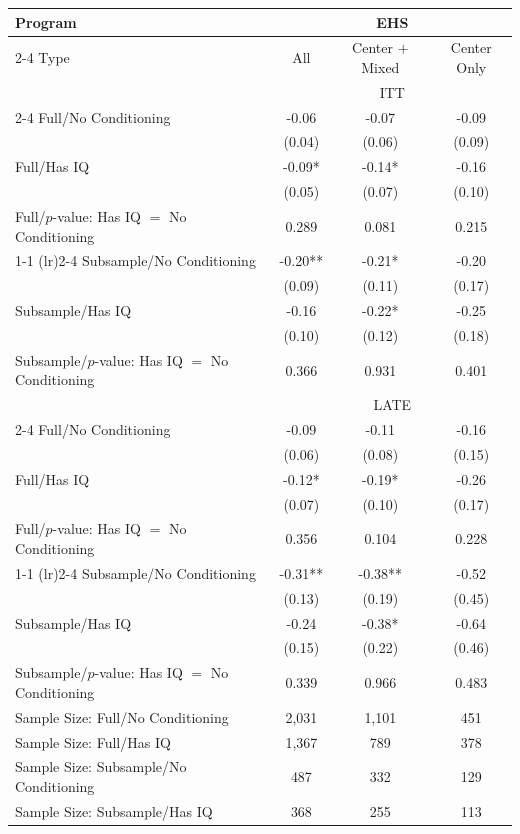 \begin{tabular}{lccc}
\toprule 
\midrule 
Program  & \multicolumn{3}{c}{EHS} \\
 \cmidrule(lr){2-4} 
Type & All & Center $+$ Mixed & Center Only \\
\midrule 
 & \multicolumn{3}{c}{ITT} \\
 \cmidrule(lr){2-4} 
Full/No Conditioning & -0.06 & -0.07 & -0.09 \\
 & (0.04) & (0.06) & (0.09) \\
Full/Has IQ & -0.09* & -0.14* & -0.16 \\
 & (0.05) & (0.07) & (0.10) \\
Full/$p$-value: Has IQ $=$ No Conditioning & 0.289 & 0.081 & 0.215 \\
 \cmidrule(lr){1-1} \cmidrule(lr){2-4} 
Subsample/No Conditioning & -0.20** & -0.21* & -0.20 \\
 & (0.09) & (0.11) & (0.17) \\
Subsample/Has IQ & -0.16 & -0.22* & -0.25 \\
 & (0.10) & (0.12) & (0.18) \\
Subsample/$p$-value: Has IQ $=$ No Conditioning & 0.366 & 0.931 & 0.401 \\
\midrule 
\midrule 
 & \multicolumn{3}{c}{LATE} \\
 \cmidrule(lr){2-4} 
Full/No Conditioning & -0.09 & -0.11 & -0.16 \\
 & (0.06) & (0.08) & (0.15) \\
Full/Has IQ & -0.12* & -0.19* & -0.26 \\
 & (0.07) & (0.10) & (0.17) \\
Full/$p$-value: Has IQ $=$ No Conditioning & 0.356 & 0.104 & 0.228 \\
 \cmidrule(lr){1-1} \cmidrule(lr){2-4} 
Subsample/No Conditioning & -0.31** & -0.38** & -0.52 \\
 & (0.13) & (0.19) & (0.45) \\
Subsample/Has IQ & -0.24 & -0.38* & -0.64 \\
 & (0.15) & (0.22) & (0.46) \\
Subsample/$p$-value: Has IQ $=$ No Conditioning & 0.339 & 0.966 & 0.483 \\
\midrule 
\midrule 
Sample Size: Full/No Conditioning & 2,031 & 1,101 & 451 \\
Sample Size: Full/Has IQ & 1,367 & 789 & 378 \\
Sample Size: Subsample/No Conditioning & 487 & 332 & 129 \\
Sample Size: Subsample/Has IQ & 368 & 255 & 113 \\
\midrule 
\bottomrule 
\end{tabular}
